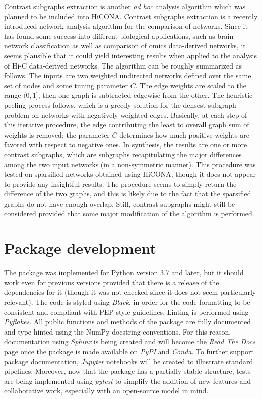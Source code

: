 Contrast subgraphs extraction is another \textit{ad hoc} analysis algorithm which was planned to be included into HiCONA. Contrast subgraphs extraction is a recently introduced network analysis algorithm for the comparison of networks. Since it has found some success into different biological applications, such as brain network classification as well as comparison of omics data-derived networks\cite{contrast2020, contrast2023}, it seems plausible that it could yield interesting results when applied to the analysis of Hi-C data-derived networks. The algorithm can be roughly summarized as follows. The inputs are two weighted undirected networks defined over the same set of nodes and some tuning parameter $C$. The edge weights are scaled to the range $(0,1]$, then one graph is subtracted edgewise from the other. The heuristic peeling process follows, which is a greedy solution for the densest subgraph problem on networks with negatively weighted edges. Basically, at each step of this iterative procedure, the edge contributing the least to overall graph sum of weights is removed; the parameter $C$ determines how much positive weights are favored with respect to negative ones. In synthesis, the results are one or more contrast subgraphs, which are subgraphs recapitulating the major differences among the two input networks (in a non-symmetric manner). This procedure was tested on sparsified networks obtained using HiCONA, though it does not appear to provide any insightful results. The procedure seems to simply return the difference of the two graphs, and this is likely due to the fact that the sparsified graphs do not have enough overlap. Still, contrast subgraphs might still be considered provided that some major modification of the algorithm is performed.


\section{Package development}

The package was implemented for Python version 3.7 and later, but it should work even for previous versions provided that there is a release of the dependencies for it (though it was not checked since it does not seem particularly relevant). 
The code is styled using \textit{Black}\cite{black2023}, in order for the code formatting to be consistent and compliant with PEP style guidelines\cite{pep2023}. Linting is performed using \textit{Pyflakes}\cite{pyflakes2023}.
All public functions and methods of the package are fully documented and type hinted using the NumPy docstring conventions. For this reason, documentation using \textit{Sphinx}\cite{sphinx2023} is being created and will become the \textit{Read The Docs} page once the package is made available on \textit{PyPI} and \textit{Conda}.
To further support package documentation, \textit{Jupyter}\cite{jupyter2023} notebooks will be created to illustrate standard pipelines. Moreover, now that the package has a partially stable structure, tests are being implemented using \textit{pytest}\cite{pytest2023} to simplify the addition of new features and collaborative work, especially with an open-source model in mind.

